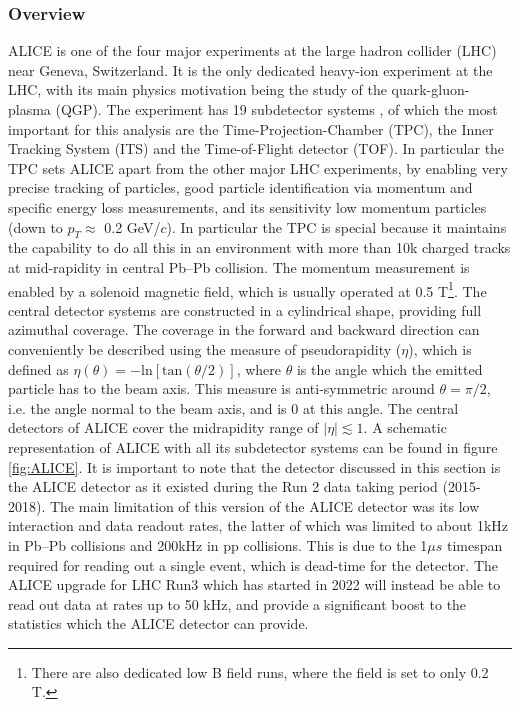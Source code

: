 \subsubsection{Overview}
ALICE is one of the four major experiments at the large hadron collider (LHC) near Geneva, Switzerland. It is the only dedicated heavy-ion experiment at the LHC, with its main physics motivation being the study of the quark-gluon-plasma (QGP). The experiment has 19 subdetector systems \cite{ALICE_overview}, of which the most important for this analysis are the Time-Projection-Chamber (TPC), the Inner Tracking System (ITS) and the Time-of-Flight detector (TOF). In particular the TPC sets ALICE apart from the other major LHC experiments, by enabling very precise tracking of particles, good particle identification via momentum and specific energy loss measurements, and its sensitivity low momentum particles (down to $p_T \approx $ 0.2 GeV/$c$). In particular the TPC is special because it maintains the capability to do all this in an environment with more than 10k charged tracks at mid-rapidity in central Pb--Pb collision. The momentum measurement is enabled by a solenoid magnetic field, which is usually operated at 0.5 T\footnote{There are also dedicated low B field runs, where the field is set to only 0.2 T.}. The central detector systems are constructed in a cylindrical shape, providing full azimuthal coverage. The coverage in the forward and backward direction can conveniently be described using the measure of pseudorapidity ($\eta$), which is defined as $\eta (\theta) = -\mathrm{ln}[\mathrm{tan}(\theta/2)]$, where $\theta$ is the angle which the emitted particle has to the beam axis. This measure is anti-symmetric around $\theta = \pi/2$, i.e. the angle normal to the beam axis, and is 0 at this angle. The central detectors of ALICE cover the midrapidity range of $|\eta|\lesssim 1$. A schematic representation of ALICE with all its subdetector systems can be found in figure \ref{fig:ALICE}. It is important to note that the detector discussed in this section is the ALICE detector as it existed during the Run 2 data taking period (2015-2018). The main limitation of this version of the ALICE detector was its low interaction and data readout rates, the latter of which was limited to about 1kHz in Pb--Pb collisions and 200kHz in pp collisions. This is due to the 1$\mu s$ timespan required for reading out a single event, which is dead-time for the detector. The ALICE upgrade for LHC Run3 which has started in 2022 will instead be able to read out data at rates up to 50 kHz, and provide a significant boost to the statistics which the ALICE detector can provide.

